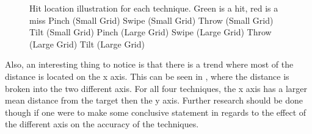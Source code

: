 \begin{figure}[H]
	\caption{
		Hit location illustration for each technique. Green is a hit, red is a miss
		\protect{} Pinch (Small Grid)
		\protect{} Swipe (Small Grid)
		\protect{} Throw (Small Grid)
		\protect{} Tilt (Small Grid)
		\protect{} Pinch (Large Grid)
		\protect{} Swipe (Large Grid)
		\protect{} Throw (Large Grid)
		\protect{} Tilt (Large Grid)
	}
	\label{fig:thitboxes}
\end{figure}


Also, an interesting thing to notice is that there is a trend where most of the distance is located on the x axis. 
This can be seen in , where the distance is broken into the two different axis. 
For all four techniques, the x axis has a larger mean distance from the target then the y axis. 
Further research should be done though if one were to make some conclusive statement in regards to the effect of the different axis on the accuracy of the techniques. 

